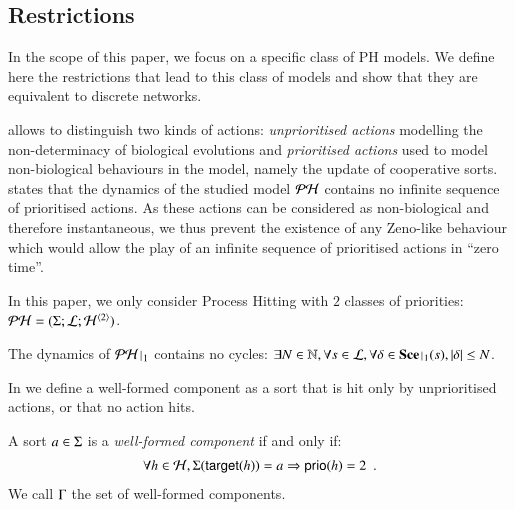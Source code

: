 \subsection{Restrictions}
\label{ssec:hypothesis}

In the scope of this paper, we focus on a specific class of PH models.
We define here the restrictions that lead to this class of models and show that they are equivalent to discrete networks.

 allows to distinguish two kinds of actions:
\emph{unprioritised actions} modelling the non-determinacy of biological evolutions
and \emph{prioritised actions} used to model non-biological behaviours in the model, namely the update of cooperative sorts.
 states that the dynamics of the studied model $\mathcal{PH}$ contains no infinite sequence of prioritised actions.
As these actions can be considered as non-biological and therefore instantaneous, we thus prevent the existence of any Zeno-like behaviour
which would allow the play of an infinite sequence of prioritised actions in “zero time”.
\begin{criterion}
\label{cr:2prio}
  In this paper, we only consider Process Hitting with $2$ classes of priorities:
  $\mathcal{PH} = (\Sigma; \mathcal{L}; \mathcal{H}^{\langle 2 \rangle})$.
\end{criterion}
%
\begin{criterion}
\label{cr:bounded}
  The dynamics of $\restriction{\PH}{1}$ contains no cycles:
  $\exists N \in \sN, \forall s \in \PHl, \forall \delta \in \restriction{\Sce}{1}(s), |\delta| \leq N$.
\end{criterion}

In  we define a well-formed component as a sort that is hit only by unprioritised actions, or that no action hits.
\begin{definition}
\label{def:component}
  A sort $a \in \Sigma$ is a \emph{well-formed component} if and only if:
  \begin{align*}
    \forall h \in \mathcal{H}, \Sigma(\mathsf{target}(h)) = a \Rightarrow \mathsf{prio}(h) = 2 \enspace.
  \end{align*}
  We call $\Gamma$ the set of well-formed components.
\end{definition}

